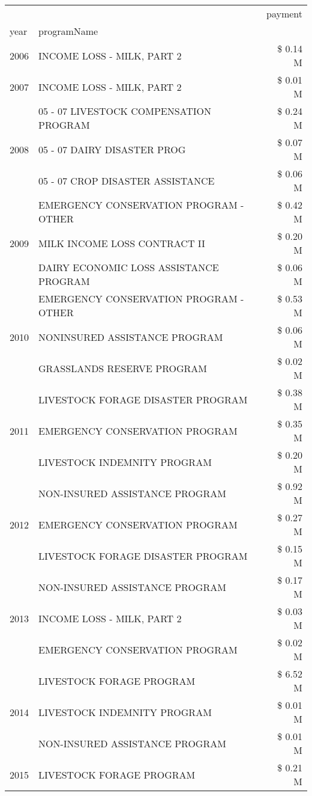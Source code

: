 \begin{tabular}{llr}
\toprule
 &  & payment \\
year & programName &  \\
\midrule
2006 & INCOME LOSS - MILK, PART 2 & \$ 0.14 M \\
\cline{1-3}
2007 & INCOME LOSS - MILK, PART 2 & \$ 0.01 M \\
\cline{1-3}
\multirow[t]{3}{*}{2008} & 05 - 07 LIVESTOCK COMPENSATION PROGRAM & \$ 0.24 M \\
 & 05 - 07 DAIRY DISASTER PROG & \$ 0.07 M \\
 & 05 - 07 CROP DISASTER ASSISTANCE & \$ 0.06 M \\
\cline{1-3}
\multirow[t]{3}{*}{2009} & EMERGENCY CONSERVATION PROGRAM - OTHER & \$ 0.42 M \\
 & MILK INCOME LOSS CONTRACT II & \$ 0.20 M \\
 & DAIRY ECONOMIC LOSS ASSISTANCE PROGRAM & \$ 0.06 M \\
\cline{1-3}
\multirow[t]{3}{*}{2010} & EMERGENCY CONSERVATION PROGRAM - OTHER & \$ 0.53 M \\
 & NONINSURED ASSISTANCE PROGRAM & \$ 0.06 M \\
 & GRASSLANDS RESERVE PROGRAM & \$ 0.02 M \\
\cline{1-3}
\multirow[t]{3}{*}{2011} & LIVESTOCK FORAGE DISASTER PROGRAM & \$ 0.38 M \\
 & EMERGENCY CONSERVATION PROGRAM & \$ 0.35 M \\
 & LIVESTOCK INDEMNITY PROGRAM & \$ 0.20 M \\
\cline{1-3}
\multirow[t]{3}{*}{2012} & NON-INSURED ASSISTANCE PROGRAM & \$ 0.92 M \\
 & EMERGENCY CONSERVATION PROGRAM & \$ 0.27 M \\
 & LIVESTOCK FORAGE DISASTER PROGRAM & \$ 0.15 M \\
\cline{1-3}
\multirow[t]{3}{*}{2013} & NON-INSURED ASSISTANCE PROGRAM & \$ 0.17 M \\
 & INCOME LOSS - MILK, PART 2 & \$ 0.03 M \\
 & EMERGENCY CONSERVATION PROGRAM & \$ 0.02 M \\
\cline{1-3}
\multirow[t]{3}{*}{2014} & LIVESTOCK FORAGE PROGRAM & \$ 6.52 M \\
 & LIVESTOCK INDEMNITY PROGRAM & \$ 0.01 M \\
 & NON-INSURED ASSISTANCE PROGRAM & \$ 0.01 M \\
\cline{1-3}
\multirow[t]{3}{*}{2015} & LIVESTOCK FORAGE PROGRAM & \$ 0.21 M \\

\end{tabular}
